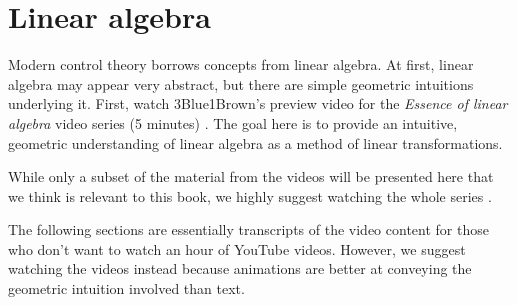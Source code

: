 
\chapter{Linear algebra}

Modern control theory borrows concepts from linear algebra. At first, linear
algebra may appear very abstract, but there are simple geometric intuitions
underlying it. First, watch 3Blue1Brown's preview video for the
\textit{Essence of linear algebra} video series (5 minutes)
\cite{bib:linalg_preview}. The goal here is to provide an intuitive, geometric
understanding of linear algebra as a method of linear transformations.

While only a subset of the material from the videos will be presented here that
we think is relevant to this book, we highly suggest watching the whole series
\cite{bib:essence_of_linalg}.

\begin{remark}
  The following sections are essentially transcripts of the video content for
  those who don't want to watch an hour of YouTube videos. However, we suggest
  watching the videos instead because animations are better at conveying the
  geometric intuition involved than text.
\end{remark}

\renewcommand*{\chapterpath}{\partpath/linear-algebra}









